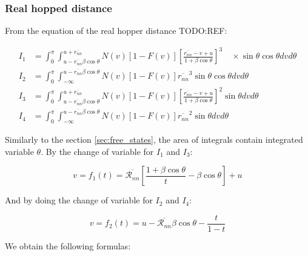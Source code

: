 \subsubsection{Real hopped distance}

From the equation of the real hopper distance TODO:REF:

\begin{equation}
    \begin{aligned}
    I_{1}&=\int_{0}^{\pi} \int_{u-\overline{r_{n n}} \beta \cos \theta}^{u+\overline{r_{n n}}} N\left(v\right)\left[1-F\left(v\right)\right]\left[\frac{\overline{r_{n n}}-v+u}{1+\beta \cos \theta}\right]^{3} \quad \times \sin \theta \cos \theta d v d \theta \\
    I_{2}&=\int_{0}^{\pi} \int_{-\infty}^{u-\overline{r_{n n}} \beta \cos \theta} N\left(v\right)\left[1-F\left(v\right)\right] \overline{r_{n n}}^{3} \sin \theta \cos \theta d v d \theta \\
    I_{3}&=\int_{0}^{\pi} \int_{u-\overline{r_{n n}} \beta \cos \theta}^{u+\overline{r_{n n}}} N\left(v\right)\left[1-F\left(v\right)\right]\left[\frac{\overline{r_{n n}}-v+u}{1+\beta \cos \theta}\right]^{2} \sin \theta d v d \theta \\
    I_{4}&=\int_{0}^{\pi} \int_{-\infty}^{u-\overline{r_{n n}} \beta \cos \theta} N\left(v\right)\left[1-F\left(v\right)\right] \overline{r_{n n}}^{2} \sin \theta d v d \theta
    \end{aligned}
    \label{eq:2_4}
\end{equation}

Similarly to the section \ref{sec:free_states}, the area of integrals contain integrated variable $\theta$. By the change of variable for $I_1$ and $I_3$:

\begin{equation}
    v = f_1(t) = \overline{\mathscr{R}_{n n}}\left[\frac{1+\beta \cos \theta}{t}-\beta \cos \theta\right]+u
    \label{eq:2_5}
\end{equation}

And by doing the change of variable for $I_2$ and $I_4$:

\begin{equation}
    v = f_2(t) = u-\overline{\mathscr{R}_{n n}} \beta \cos \theta-\frac{t}{1-t}
    \label{eq:2_6}
\end{equation}

We obtain the following formulas:

